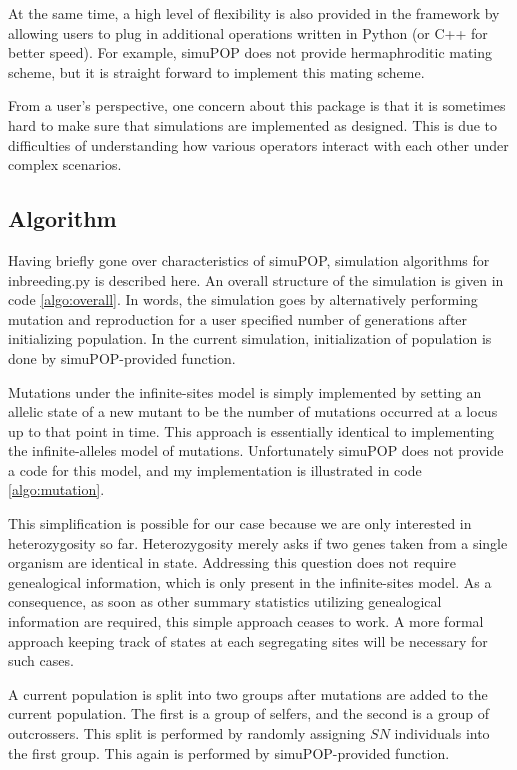 \documentclass[12pt]{article}
\begin{document}
At the same time, a high level of flexibility is also provided in the
framework by allowing users to plug in additional operations written
in Python (or C++ for better speed).
For example, simuPOP does not provide hermaphroditic mating scheme,
but it is straight forward to implement this mating scheme.

From a user's perspective, one concern about this package is that it
is sometimes hard to make sure that simulations are implemented as
designed.
This is due to difficulties of understanding how various operators
interact with each other under complex scenarios.

\subsection{Algorithm}
\label{sec:algorithm}

Having briefly gone over characteristics of simuPOP, simulation
algorithms for inbreeding.py is described here.
An overall structure of the simulation is given in code \ref{algo:overall}.
In words, the simulation goes by alternatively performing
mutation and reproduction for a user specified number of generations
after initializing population.
In the current simulation, initialization of population is done by
simuPOP-provided function.

Mutations under the infinite-sites model is simply implemented by
setting an allelic state of a new mutant to be the number of mutations
occurred at a locus up to that point in time.
This approach is essentially identical to implementing the
infinite-alleles model of mutations.
Unfortunately simuPOP does not provide a code for this model,
and my implementation is illustrated in code \ref{algo:mutation}.

This simplification is possible for our case because we are only
interested in heterozygosity so far.
Heterozygosity merely asks if two genes taken from a single organism
are identical in state.
Addressing this question does not require genealogical information,
which is only present in the infinite-sites model.
As a consequence, as soon as other summary statistics utilizing
genealogical information are required, this simple approach ceases to
work.
A more formal approach keeping track of states at each segregating
sites will be necessary for such cases.

A current population is split into two groups after mutations are
added to the current population.
The first is a group of selfers, and the second is a group of
outcrossers.
This split is performed by randomly assigning \(S N\)
individuals into the first group.
This again is performed by simuPOP-provided function.
\end{document}
